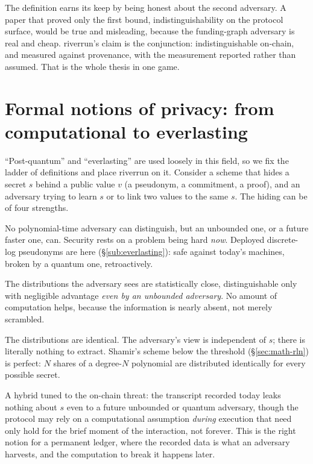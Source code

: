 \documentclass[11pt]{article}
\begin{document}
The definition earns its keep by being honest about the second adversary. A paper that
proved only the first bound, indistinguishability on the protocol surface, would be true
and misleading, because the funding-graph adversary is real and cheap. riverrun's claim is
the conjunction: indistinguishable on-chain, and measured against provenance, with the
measurement reported rather than assumed. That is the whole thesis in one game.

\section{Formal notions of privacy: from computational to everlasting}
\label{sec:math-notions}

``Post-quantum'' and ``everlasting'' are used loosely in this field, so we fix the ladder
of definitions and place riverrun on it. Consider a scheme that hides a secret $s$ behind
a public value $v$ (a pseudonym, a commitment, a proof), and an adversary trying to learn
$s$ or to link two values to the same $s$. The hiding can be of four strengths.

\begin{description}[leftmargin=1.4em,itemsep=0.25em]
\item[Computational.] No polynomial-time adversary can distinguish, but an unbounded one,
or a future faster one, can. Security rests on a problem being hard \emph{now}. Deployed
discrete-log pseudonyms are here (\S\ref{sub:everlasting}): safe against today's machines,
broken by a quantum one, retroactively.
\item[Statistical.] The distributions the adversary sees are statistically close,
distinguishable only with negligible advantage \emph{even by an unbounded adversary}. No
amount of computation helps, because the information is nearly absent, not merely
scrambled.
\item[Perfect.] The distributions are identical. The adversary's view is independent of
$s$; there is literally nothing to extract. Shamir's scheme below the threshold
(\S\ref{sec:math-rln}) is perfect: $N$ shares of a degree-$N$ polynomial are
distributed identically for every possible secret.
\item[Everlasting.] A hybrid tuned to the on-chain threat: the transcript recorded today
leaks nothing about $s$ even to a future unbounded or quantum adversary, though the
protocol may rely on a computational assumption \emph{during} execution that need only
hold for the brief moment of the interaction, not forever. This is the right notion for a
permanent ledger, where the recorded data is what an adversary harvests, and the
computation to break it happens later.
\end{description}
\end{document}
